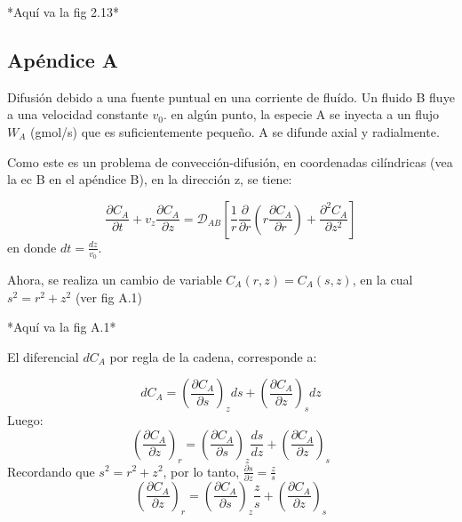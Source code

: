 *Aquí va la fig 2.13*

\subsection{Apéndice A}
Difusión debido a una fuente puntual en una corriente de fluído.
Un fluido B fluye a una velocidad constante $v_0$. en algún punto, la especie A se inyecta a un flujo $W_A$ (gmol/s) que es suficientemente pequeño. A se difunde axial y radialmente.

Como este es un problema de convección-difusión, en coordenadas cilíndricas (vea la ec B en el apéndice B), en la dirección z, se tiene:

\begin{equation}
    \frac{\partial C_A}{\partial t}+v_z\frac{\partial C_A}{\partial z}=\mathscr{D}_{AB}[\frac{1}{r}\frac{\partial }{\partial r}(r\frac{\partial C_A}{\partial r})+\frac{\partial ^2C_A}{\partial z^2}]
\end{equation}
en donde $dt=\frac{dz}{v_0}$.

Ahora, se realiza un cambio de variable $C_A(r,z)=C_A(s,z)$, en la cual $s^2=r^2+z^2$ (ver fig A.1)

*Aquí va la fig A.1*

El diferencial $dC_A$ por regla de la cadena, corresponde a:

\begin{equation*}
    dC_A=(\frac{\partial C_A}{\partial s})_zds+(\frac{\partial C_A}{\partial z})_sdz
\end{equation*}
Luego:
\begin{equation*}
    (\frac{\partial C_A}{\partial z})_r=(\frac{\partial C_A}{\partial s})_z\frac{ds}{dz}+(\frac{\partial C_A}{\partial z})_s
\end{equation*}
Recordando que $s^2=r^2+z^2$, por lo tanto, $\frac{\partial s}{\partial z}=\frac{z}{s}$
\begin{equation*}
    (\frac{\partial C_A}{\partial z})_r=(\frac{\partial C_A}{\partial s})_z\frac{z}{s}+(\frac{\partial C_A}{\partial z})_s
\end{equation*}

